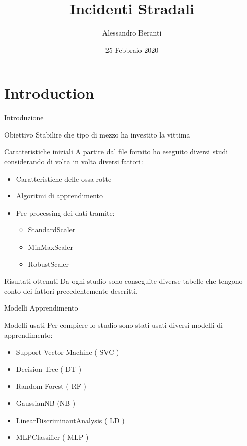 \documentclass{beamer}
\title[Your Short Title]{Incidenti Stradali}
\author{Alessandro Beranti}
\institute{Università degli Studi di Milano Statale }
\date{25 Febbraio 2020}
\begin{document}
\begin{frame}
  \titlepage
\end{frame}


\section{Introduction}

\begin{frame}{Introduzione}

\begin{block}{Obiettivo}
	Stabilire che tipo di mezzo ha investito la vittima
\end{block}

\begin{block}{Caratteristiche iniziali}
A partire dal file fornito ho eseguito diversi studi considerando di volta in volta diversi fattori:
\end{block}

\begin{itemize}
	\item Caratteristiche delle ossa rotte
	\item Algoritmi di apprendimento
	\item Pre-processing dei dati tramite: 
	\begin{itemize}
		\item StandardScaler
		\item MinMaxScaler
		\item RobustScaler
	\end{itemize}
\end{itemize}


\begin{block}{Risultati ottenuti}
Da ogni studio sono conseguite diverse tabelle che tengono conto dei fattori precedentemente descritti.
\end{block}

\end{frame}

\begin{frame}{Modelli Apprendimento}
\begin{block}{Modelli usati}
	Per compiere lo studio sono stati usati diversi modelli di apprendimento:
	\begin{itemize}
		\item Support Vector Machine ( SVC )
		\item Decision Tree ( DT )
		\item Random Forest ( RF )
		\item GaussianNB (NB )
		\item LinearDiscriminantAnalysis ( LD )
		\item MLPClassifier ( MLP )
	\end{itemize}
\end{block}

\end{frame}
\end{document}
